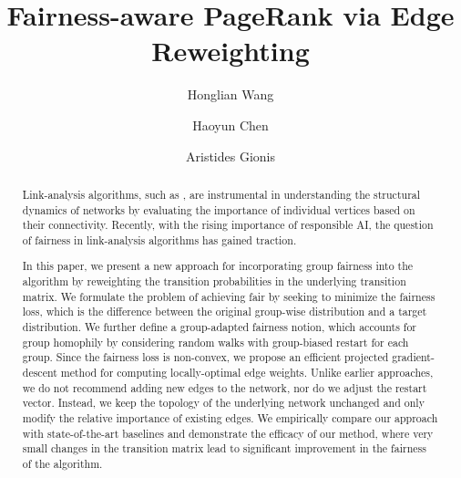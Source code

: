 \documentclass[sigconf, anonymous, review]{acmart}
\begin{document}
\title{Fairness-aware PageRank via Edge Reweighting}

\author{Honglian Wang}

\author{Haoyun Chen}


\author{Aristides Gionis}

\begin{abstract}
Link-analysis algorithms, such as \pagerank, are instrumental in understanding the structural dynamics of networks by evaluating the importance of individual vertices based on their connectivity. Recently, with the rising importance of responsible AI, the question of fairness in link-analysis algorithms has gained traction.

In this paper, we present a new approach for incorporating group fairness into the \pagerank algorithm by reweighting the transition probabilities in the underlying transition matrix. We formulate the problem of achieving fair \pagerank by seeking to minimize the fairness loss, which is the difference between the original group-wise \pagerank distribution and a target \pagerank distribution. We further define a group-adapted fairness notion, which accounts for group homophily by considering random walks with group-biased restart for each group.
Since the fairness loss is non-convex, we propose an efficient projected gradient-descent method for computing locally-optimal edge weights. Unlike earlier approaches, we do not recommend adding new edges to the network, nor do we adjust the restart vector. Instead, we keep the topology of the underlying network unchanged and only modify the relative importance of existing edges. We empirically compare our approach with state-of-the-art baselines and demonstrate the efficacy of our method, where very small changes in the transition matrix lead to significant improvement in the fairness of the \pagerank algorithm.
%
\end{abstract}
\end{document}
